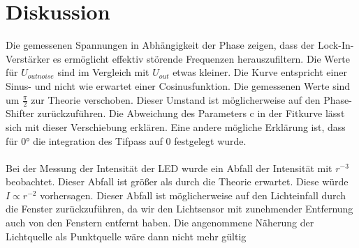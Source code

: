 \section{Diskussion}
\label{sec:Diskussion}

Die gemessenen Spannungen in Abhängigkeit der Phase zeigen, dass der Lock-In-Verstärker es ermöglicht effektiv 
störende Frequenzen herauszufiltern. Die Werte für $U_{outnoise}$ sind im Vergleich mit $U_{out}$ etwas kleiner.
Die Kurve entspricht einer Sinus- und nicht wie erwartet einer Cosinusfunktion. Die gemessenen Werte sind um 
$\frac{\pi}{2}$ zur Theorie verschoben. Dieser Umstand ist möglicherweise auf den Phase-Shifter zurückzuführen.
Die Abweichung des Parameters c in der Fitkurve lässt sich mit dieser Verschiebung erklären. Eine andere mögliche Erklärung 
ist, dass für $0°$ die integration des Tifpass auf $0$ festgelegt wurde.
\\
\\
Bei der Messung der Intensität der LED wurde ein Abfall der Intensität mit $r^{-3}$ beobachtet. Dieser Abfall ist 
größer als durch die Theorie erwartet. Diese würde $I \propto r^{-2}$ vorhersagen. 
Dieser Abfall ist möglicherweise auf den Lichteinfall 
durch die Fenster zurückzuführen, da wir den Lichtsensor mit zunehmender Entfernung auch von den Fenstern entfernt haben. Die angenommene Näherung
der Lichtquelle als Punktquelle wäre dann nicht mehr gültig\\
%
\newpage
